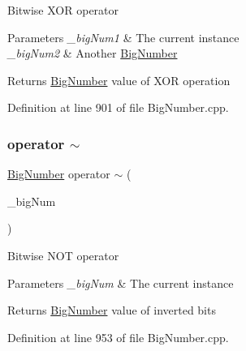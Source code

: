 Bitwise X\+OR operator 
\begin{DoxyParams}{Parameters}
{\em \+\_\+big\+Num1} & The current instance \\
\hline
{\em \+\_\+big\+Num2} & Another \mbox{\hyperlink{class_big_nums_1_1_big_number}{Big\+Number}} \\
\hline
\end{DoxyParams}
\begin{DoxyReturn}{Returns}
\mbox{\hyperlink{class_big_nums_1_1_big_number}{Big\+Number}} value of X\+OR operation 
\end{DoxyReturn}


Definition at line 901 of file Big\+Number.\+cpp.

\mbox{\label{class_big_nums_1_1_big_number_a09ab9caa6f21204eed61e6e96e9e72cc}} 
\subsubsection{\texorpdfstring{operator $\sim$}{operator ~}}
{\footnotesize\ttfamily \mbox{\hyperlink{class_big_nums_1_1_big_number}{Big\+Number}} operator $\sim$ (\begin{DoxyParamCaption}\item[{const \mbox{\hyperlink{class_big_nums_1_1_big_number}{Big\+Number}} \&}]{\+\_\+big\+Num }\end{DoxyParamCaption})\hspace{0.3cm}{\ttfamily [friend]}}

Bitwise N\+OT operator 
\begin{DoxyParams}{Parameters}
{\em \+\_\+big\+Num} & The current instance \\
\hline
\end{DoxyParams}
\begin{DoxyReturn}{Returns}
\mbox{\hyperlink{class_big_nums_1_1_big_number}{Big\+Number}} value of inverted bits 
\end{DoxyReturn}


Definition at line 953 of file Big\+Number.\+cpp.

\mbox{\label{class_big_nums_1_1_big_number_a3d910bc1823b1290f26b1764a93e77ea}} 
